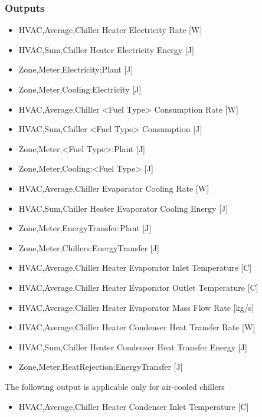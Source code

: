 \subsubsection{Outputs}\label{outputs-8-005}

\begin{itemize}
    \item
    HVAC,Average,Chiller Heater Electricity Rate {[}W{]}
    \item
    HVAC,Sum,Chiller Heater Electricity Energy {[}J{]}
    \item
    Zone,Meter,Electricity:Plant {[}J{]}
    \item
    Zone,Meter,Cooling:Electricity {[}J{]}
    \item
    HVAC,Average,Chiller \textless{}Fuel Type\textgreater{} Consumption Rate {[}W{]}
    \item
    HVAC,Sum,Chiller \textless{}Fuel Type\textgreater{} Consumption {[}J{]}
    \item
    Zone,Meter,\textless{}Fuel Type\textgreater{}:Plant {[}J{]}
    \item
    Zone,Meter,Cooling:\textless{}Fuel Type\textgreater{} {[}J{]}
    \item
    HVAC,Average,Chiller Evaporator Cooling Rate {[}W{]}
    \item
    HVAC,Sum,Chiller Heater Evaporator Cooling Energy {[}J{]}
    \item
    Zone,Meter,EnergyTransfer:Plant {[}J{]}
    \item
    Zone,Meter,Chillers:EnergyTransfer {[}J{]}
    \item
    HVAC,Average,Chiller Heater Evaporator Inlet Temperature {[}C{]}
    \item
    HVAC,Average,Chiller Heater Evaporator Outlet Temperature {[}C{]}
    \item
    HVAC,Average,Chiller Heater Evaporator Mass Flow Rate {[}kg/s{]}
    \item
    HVAC,Average,Chiller Heater Condenser Heat Transfer Rate {[}W{]}
    \item
    HVAC,Sum,Chiller Heater Condenser Heat Transfer Energy {[}J{]}
    \item
    Zone,Meter,HeatRejection:EnergyTransfer {[}J{]}
\end{itemize}

The following output is applicable only for air-cooled chillers

\begin{itemize}
    \tightlist
    \item
    HVAC,Average,Chiller Heater Condenser Inlet Temperature {[}C{]}
\end{itemize}

